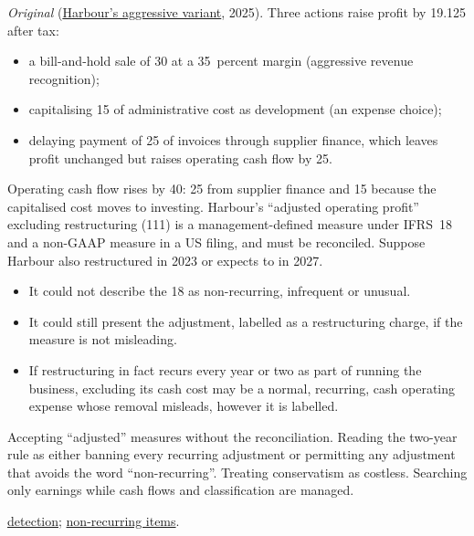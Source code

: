 \begin{qfmethod}
 \emph{Original} (\hyperref[meth:report-quality-evaluation]{Harbour's aggressive variant}, 2025). Three actions raise profit by 19.125 after tax:
\begin{itemize}
\item a bill-and-hold sale of 30 at a 35~percent margin (aggressive revenue recognition);
\item capitalising 15 of administrative cost as development (an expense choice);
\item delaying payment of 25 of invoices through supplier finance, which leaves profit unchanged but raises operating cash flow by 25.
\end{itemize}
Operating cash flow rises by 40: 25 from supplier finance and 15 because the capitalised cost moves to investing. Harbour's ``adjusted operating profit'' excluding restructuring (111) is a management-defined measure under IFRS~18 and a non-GAAP measure in a US filing, and must be reconciled. Suppose Harbour also restructured in 2023 or expects to in 2027.
\begin{itemize}
\item It could not describe the 18 as non-recurring, infrequent or unusual.
\item It could still present the adjustment, labelled as a restructuring charge, if the measure is not misleading.
\item If restructuring in fact recurs every year or two as part of running the business, excluding its cash cost may be a normal, recurring, cash operating expense whose removal misleads, however it is labelled.
\end{itemize}

 Accepting ``adjusted'' measures without the reconciliation. Reading the two-year rule as either banning every recurring adjustment or permitting any adjustment that avoids the word ``non-recurring''. Treating conservatism as costless. Searching only earnings while cash flows and classification are managed.

 \hyperref[meth:reporting-warning-signs]{detection}; \hyperref[meth:non-recurring-items]{non-recurring items}.

\end{qfmethod}

